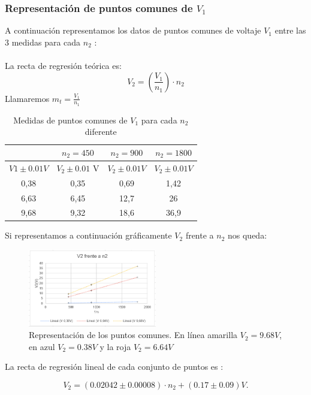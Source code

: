 \documentclass[11pt,letterpaper,twocolumn]{article}
\begin{document}
		\subsubsection{Representación de puntos comunes de $V_1$}

		A continuación representamos los datos de puntos comunes de voltaje $V_1$ entre las 3 medidas para cada $n_2$ :	\\
\\
La recta de regresión teórica es:
\begin{equation}
	V_2=(\frac{V_1}{n_1})\cdot n_2	
\end{equation}
Llamaremos $m_t=\frac{V_1}{n_1}$
		\begin{table}[H]
			\caption{Medidas de puntos comunes de $V_1$ para cada $n_2$ diferente}
			\centering
			\begin{tabular}{|c|c|c|c|}
				\hline
				\multicolumn{1}{|c|}{} & $n_2=450$ & $n_2=900$ & $n_2=1800$ \\ \hline
				$V1\pm 0.01 V$ & $V_2 \pm 0.01$ V & $V_2  \pm 0.01 V$  & $V_2 \pm 0.01 V$ \\ \hline
				0,38 & 0,35 & 0,69 & 1,42 \\ 
				6,63 & 6,45 & 12,7 & 26 \\ 
				9,68 & 9,32 & 18,6 & 36,9 \\ \hline
			\end{tabular}
			\label{}
		\end{table}
		Si representamos a continuación gráficamente $V_2$ frente a $n_2$ nos queda:
		\begin{figure}[H]
			\centering
			\includegraphics[width=0.5\textwidth]{vcomun.PNG}
			\caption{Representación de los puntos comunes. En línea amarilla $V_2=9.68 V$, en azul $V_2=0.38V$ y la roja $V_2=6.64V$}
			\label{fig:vcomun-png}
		\end{figure}
		La recta de regresión lineal de cada conjunto de puntos es :
		\begin{tcolorbox}[colback=yellow!5!white,colframe=yellow!75!black,fonttitle=\bfseries,title= \[
		V_1: 9.68 V
		.\] ]
		\[
			V_2=\left( 0.02042 \pm 0.00008 \right) \cdot n_2+\left( 0.17 \pm 0.09 \right) V
		.\] 	 
	\end{tcolorbox}
\end{document}
